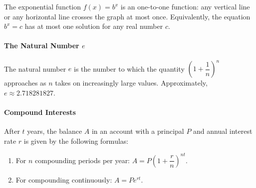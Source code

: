 \begin{note}
	The exponential function $f(x)=b^x$ is an one-to-one function: any vertical line or any horizontal line crosses the graph at most once. Equivalently, the equation $b^x=c$ has at most one solution for any real number $c$.
\end{note}
\paragraph*{The Natural Number $e$}
	The natural number $e$ is the number to which the quantity  $\left(1+\dfrac1n\right)^n$ approaches as $n$ takes on increasingly large values.
	Approximately,  $e\approx2.718281827$.

	\paragraph*{Compound Interests}
	After $t$ years, the balance $A$ in an account with a principal $P$ and annual interest rate $r$ is given by the following formulas:

	\begin{enumerate}
		\item For $n$ compounding periods per year: $A=P\left(1+\dfrac{r}{n}\right)^{nt}$.
		\item For compounding continuously: $A=Pe^{rt}$.
	\end{enumerate}


